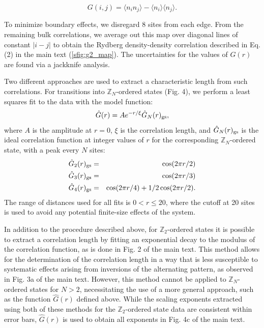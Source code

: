 \documentclass[prl,nobalancelastpage,superscriptaddress,twocolumn,nofootinbib]{revtex4}
\begin{document}
\begin{equation}
G(i,j) = \langle{n_{i}n_{j}}\rangle - \langle{n_i}\rangle\langle{n_j}\rangle.
\end{equation}

To minimize boundary effects, we disregard 8 sites from each edge. From the remaining bulk correlations, we average out this map over diagonal lines of constant $|i-j|$ to obtain the Rydberg density-density correlation described in Eq. (2) in the main text (\ref{sfig:g2_map}). The uncertainties for the values of $G(r)$ are found via a jackknife analysis.

Two different approaches are used to extract a characteristic length from such correlations. For transitions into $\mathbb{Z}_N$-ordered states (Fig. 4), we  perform a least squares fit to the data with the model function:
\begin{equation}
    \label{eq:IndividualCorrelation}
    \hat{G}(r) = Ae^{-r/\xi}\hat{G}_{N}(r)_{\rm gs},
\end{equation}
where $A$ is the amplitude at $r=0$, $\xi$ is the correlation length, and $\hat{G}_{N}(r)_{\rm gs}$ is the ideal correlation function at integer values of $r$ for the corresponding $\mathbb{Z}_N$-ordered state, with a peak every $N$ sites: 
\begin{eqnarray}
  \hat{G}_{2}(r)_{\rm gs} &=&  \cos(2\pi r/2)  \nonumber \\
  \hat{G}_{3}(r)_{\rm gs} &=&  \cos(2\pi r/3)\\
  \hat{G}_{4}(r)_{\rm gs} &=&  \cos(2\pi r/4)+1/2\cos(2\pi r/2) \nonumber .
\end{eqnarray}
The range of distances used for all fits is $0<r\leq20$, where the cutoff at 20 sites is used to avoid any potential finite-size effects of the system. 

In addition to the procedure described above, for $\mathbb{Z}_2$-ordered states it is possible to extract a correlation length by fitting an exponential decay to the modulus of the correlation function, as is done in Fig. 2 of the main text. This method allows for  the determination of the correlation length in a way that is less susceptible to systematic effects arising from inversions of the alternating pattern, as observed in Fig. 3a of the main text. However, this method cannot be applied to $\mathbb{Z}_N$-ordered states for $N>2$, necessitating the use of a more general approach, such as the function $\hat{G}(r)$ defined above. While the scaling exponents extracted using both of these methods for the $\mathbb{Z}_2$-ordered state data are consistent within error bars, $\hat{G}(r)$ is used to obtain all exponents in Fig. 4c of the main text. 
\end{document}
